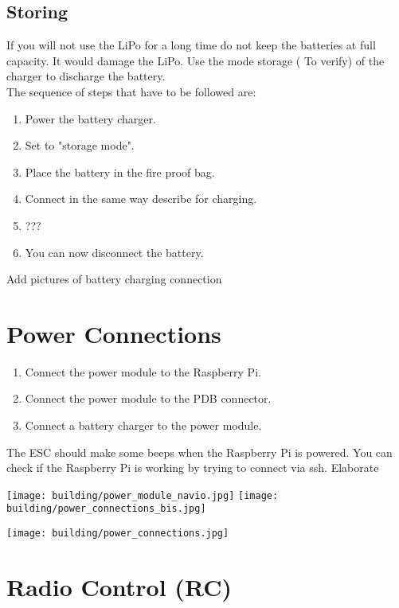         \subsection{Storing}
            If you will not use the LiPo for a long time do not keep the batteries at full capacity. It would damage the LiPo. Use the mode storage ({\color{orange} To verify}) of the charger to discharge the battery.\\
            The sequence of steps that have to be followed are:
            \begin{enumerate}
                \item Power the battery charger.
                \item Set to "storage mode".
                \item Place the battery in the fire proof bag.
                \item Connect in the same way describe for charging.
                \item ???
                \item You can now disconnect the battery.
            \end{enumerate}
            
            {\color{blue} Add pictures of battery charging connection}
        
    \section{Power Connections}
        \begin{enumerate}
            \item Connect the power module to the Raspberry Pi.
            \item Connect the power module to the PDB connector.
            \item Connect a battery charger to the power module.
        \end{enumerate}
        The ESC should make some beeps when the Raspberry Pi is powered.
        You can check if the Raspberry Pi is working by trying to connect via ssh.
        {\color{orange} Elaborate}
        
        \texttt{[image: building/power\_module\_navio.jpg]}
        \texttt{[image: building/power\_connections\_bis.jpg]}
        
        \texttt{[image: building/power\_connections.jpg]}
        
    \section{Radio Control (RC)}
